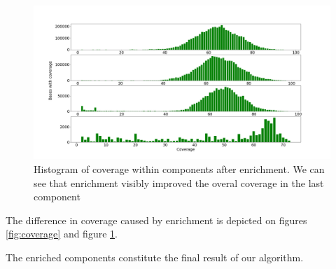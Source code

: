 \begin{figure}
\includegraphics[width=450bp]{figures/coverage_enriched.png}
\caption{Histogram of coverage within components after enrichment. We can see that enrichment visibly improved the overal coverage in the last component}
\label{fig:coverage_enriched}
\end{figure}

The difference in coverage caused by enrichment is depicted on figures \ref{fig:coverage} and figure \ref{fig:coverage_enriched}.

The enriched components constitute the final result of our algorithm.